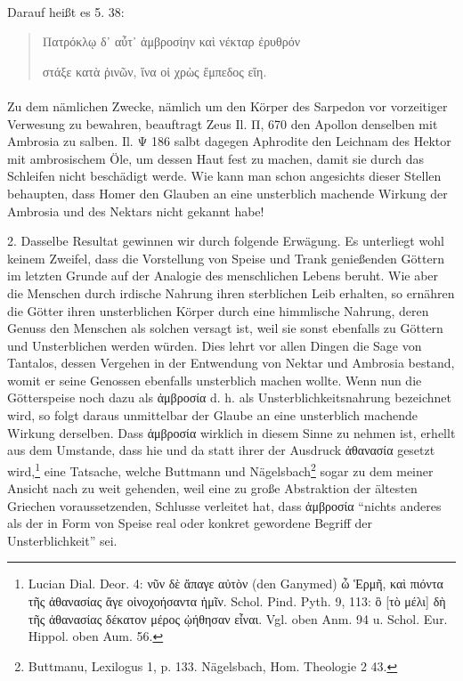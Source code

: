 \documentclass[a4paper, 11pt, oneside]{article}
\begin{document}
\paragraph{}
Darauf heißt es 5. 38:
\begin{quotation}
Πατρόκλῳ δ᾽ αὖτ᾽ ἀμβροσίην καὶ νέκταρ ἐρυθρόν

στάξε κατὰ ῥινῶν, ἵνα οἱ χρὼς ἔμπεδος εἴη.
\end{quotation}
\paragraph{}
Zu dem nämlichen Zwecke, nämlich um den Körper des Sarpedon vor vorzeitiger Verwesung zu bewahren, beauftragt Zeus Il. Π, 670 den Apollon denselben mit Ambrosia zu salben. Il. Ψ 186 salbt dagegen Aphrodite den Leichnam des Hektor mit ambrosischem Öle, um dessen Haut fest zu machen, damit sie durch das Schleifen nicht beschädigt werde. Wie kann man schon angesichts dieser Stellen behaupten, dass Homer den Glauben an eine unsterblich machende Wirkung der Ambrosia und des Nektars nicht gekannt habe!

2. Dasselbe Resultat gewinnen wir durch folgende Erwägung. Es unterliegt wohl keinem Zweifel, dass die Vorstellung von Speise und Trank genießenden Göttern im letzten Grunde auf der Analogie des menschlichen Lebens beruht. Wie aber die Menschen durch irdische Nahrung ihren sterblichen Leib erhalten, so ernähren die Götter ihren unsterblichen Körper durch eine himmlische Nahrung, deren Genuss den Menschen als solchen versagt ist, weil sie sonst ebenfalls zu Göttern und Unsterblichen werden würden. Dies lehrt vor allen Dingen die Sage von Tantalos, dessen Vergehen in der Entwendung von Nektar und Ambrosia bestand, womit er seine Genossen ebenfalls unsterblich machen wollte. Wenn nun die Götterspeise noch dazu als ἀμβροσία d. h. als Unsterblichkeitsnahrung bezeichnet wird, so folgt daraus unmittelbar der Glaube an eine unsterblich machende Wirkung derselben. Dass ἀμβροσία wirklich in diesem Sinne zu nehmen ist, erhellt aus dem Umstande, dass hie und da statt ihrer der Ausdruck ἀθανασία gesetzt wird,\footnote{Lucian Dial. Deor. 4: νῦν δὲ ἄπαγε αὐτὸν (den Ganymed) ὦ Ἑρμῆ, καὶ πιόντα τῆς ἀθανασίας ἄγε οἰνοχοήσαντα ἡμῖν. Schol. Pind. Pyth. 9, 113: ὃ [τὸ μέλι] δὴ τῆς ἀθανασίας δέκατον μέρος ᾠήθησαν εἶναι. Vgl. oben Anm. 94 u. Schol. Eur. Hippol. oben Aum. 56.} eine Tatsache, welche Buttmann und Nägelsbach\footnote{Buttmanu, Lexilogus 1, p. 133. Nägelsbach, Hom. Theologie 2 43.} sogar zu dem meiner Ansicht nach zu weit gehenden, weil eine zu große Abstraktion der ältesten Griechen voraussetzenden, Schlusse verleitet hat, dass ἀμβροσία "`nichts anderes als der in Form von Speise real oder konkret gewordene Begriff der Unsterblichkeit"' sei.
\end{document}
